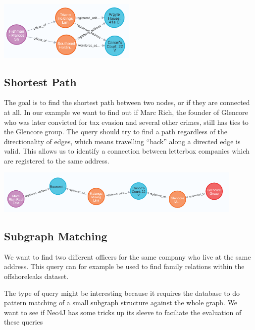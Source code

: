 \documentclass[11pt, a4paper,oneside,chapterprefix=false]{scrbook}
\begin{document}
\begin{center}
\includegraphics*[width=0.5\textwidth]{figures/query-two-hop.png}
\end{center}

\subsection{Shortest Path}

The goal is to find the shortest path between two nodes, or if they are connected at all. In our example we want to find out if Marc Rich, the founder of Glencore who was later convicted for tax evasion and several other crimes, still has ties to the Glencore group.
The query should try to find a path regardless of the directionality of edges, which means travelling ``back'' along a directed edge is valid.
This allows us to identify a connection between letterbox companies which are registered to the same address.

\begin{center}
\includegraphics*[width=0.9\textwidth]{figures/query-shortest-path-2.png}
\end{center}


\subsection{Subgraph Matching}

We want to find two different officers for the same company who live at the same address.
This query can for example be used to find family relations within the offshoreleaks dataset.

The type of query might be interesting because it requires the database to do pattern matching of a small subgraph structure against the whole graph.
We want to see if Neo4J has some tricks up its sleeve to faciliate the evaluation of these queries
\end{document}
